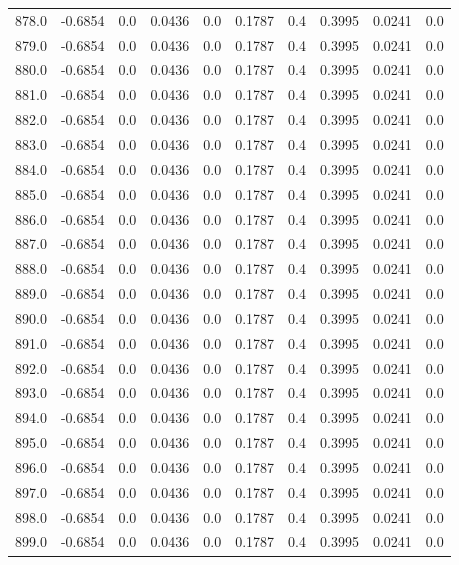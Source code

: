 \begin{longtable}{lrrrrrrrrr}
878.0 & -0.6854 & 0.0 & 0.0436 & 0.0 & 0.1787 & 0.4 & 0.3995 & 0.0241 & 0.0 \\
879.0 & -0.6854 & 0.0 & 0.0436 & 0.0 & 0.1787 & 0.4 & 0.3995 & 0.0241 & 0.0 \\
880.0 & -0.6854 & 0.0 & 0.0436 & 0.0 & 0.1787 & 0.4 & 0.3995 & 0.0241 & 0.0 \\
881.0 & -0.6854 & 0.0 & 0.0436 & 0.0 & 0.1787 & 0.4 & 0.3995 & 0.0241 & 0.0 \\
882.0 & -0.6854 & 0.0 & 0.0436 & 0.0 & 0.1787 & 0.4 & 0.3995 & 0.0241 & 0.0 \\
883.0 & -0.6854 & 0.0 & 0.0436 & 0.0 & 0.1787 & 0.4 & 0.3995 & 0.0241 & 0.0 \\
884.0 & -0.6854 & 0.0 & 0.0436 & 0.0 & 0.1787 & 0.4 & 0.3995 & 0.0241 & 0.0 \\
885.0 & -0.6854 & 0.0 & 0.0436 & 0.0 & 0.1787 & 0.4 & 0.3995 & 0.0241 & 0.0 \\
886.0 & -0.6854 & 0.0 & 0.0436 & 0.0 & 0.1787 & 0.4 & 0.3995 & 0.0241 & 0.0 \\
887.0 & -0.6854 & 0.0 & 0.0436 & 0.0 & 0.1787 & 0.4 & 0.3995 & 0.0241 & 0.0 \\
888.0 & -0.6854 & 0.0 & 0.0436 & 0.0 & 0.1787 & 0.4 & 0.3995 & 0.0241 & 0.0 \\
889.0 & -0.6854 & 0.0 & 0.0436 & 0.0 & 0.1787 & 0.4 & 0.3995 & 0.0241 & 0.0 \\
890.0 & -0.6854 & 0.0 & 0.0436 & 0.0 & 0.1787 & 0.4 & 0.3995 & 0.0241 & 0.0 \\
891.0 & -0.6854 & 0.0 & 0.0436 & 0.0 & 0.1787 & 0.4 & 0.3995 & 0.0241 & 0.0 \\
892.0 & -0.6854 & 0.0 & 0.0436 & 0.0 & 0.1787 & 0.4 & 0.3995 & 0.0241 & 0.0 \\
893.0 & -0.6854 & 0.0 & 0.0436 & 0.0 & 0.1787 & 0.4 & 0.3995 & 0.0241 & 0.0 \\
894.0 & -0.6854 & 0.0 & 0.0436 & 0.0 & 0.1787 & 0.4 & 0.3995 & 0.0241 & 0.0 \\
895.0 & -0.6854 & 0.0 & 0.0436 & 0.0 & 0.1787 & 0.4 & 0.3995 & 0.0241 & 0.0 \\
896.0 & -0.6854 & 0.0 & 0.0436 & 0.0 & 0.1787 & 0.4 & 0.3995 & 0.0241 & 0.0 \\
897.0 & -0.6854 & 0.0 & 0.0436 & 0.0 & 0.1787 & 0.4 & 0.3995 & 0.0241 & 0.0 \\
898.0 & -0.6854 & 0.0 & 0.0436 & 0.0 & 0.1787 & 0.4 & 0.3995 & 0.0241 & 0.0 \\
899.0 & -0.6854 & 0.0 & 0.0436 & 0.0 & 0.1787 & 0.4 & 0.3995 & 0.0241 & 0.0 \\

\end{longtable}
